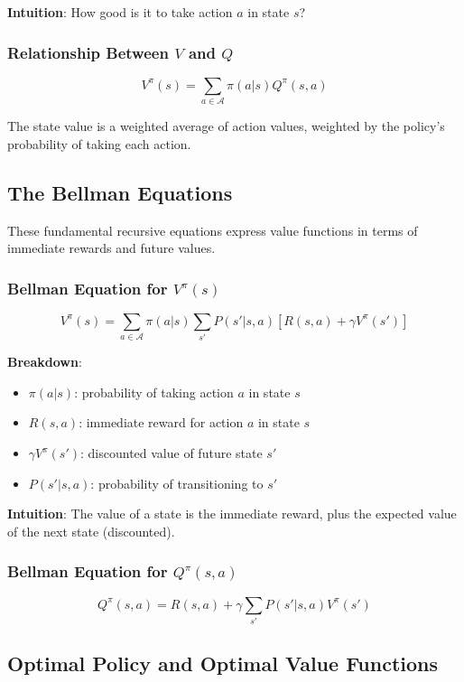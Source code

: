 \documentclass[12pt,a4paper]{article}
\begin{document}
\textbf{Intuition}: How good is it to take action $a$ in state $s$?

\subsubsection{Relationship Between $V$ and $Q$}

\[
V^{\pi}(s) = \sum_{a \in \mathcal{A}} \pi(a|s) Q^{\pi}(s, a)
\]

The state value is a weighted average of action values, weighted by the policy's probability of taking each action.

\subsection{The Bellman Equations}

These fundamental recursive equations express value functions in terms of immediate rewards and future values.

\subsubsection{Bellman Equation for $V^{\pi}(s)$}

\[
V^{\pi}(s) = \sum_{a \in \mathcal{A}} \pi(a|s) \sum_{s'} P(s'|s,a) \left[ R(s,a) + \gamma V^{\pi}(s') \right]
\]

\textbf{Breakdown}:
\begin{itemize}
    \item $\pi(a|s)$: probability of taking action $a$ in state $s$
    \item $R(s,a)$: immediate reward for action $a$ in state $s$
    \item $\gamma V^{\pi}(s')$: discounted value of future state $s'$
    \item $P(s'|s,a)$: probability of transitioning to $s'$
\end{itemize}

\textbf{Intuition}: The value of a state is the immediate reward, plus the expected value of the next state (discounted).

\subsubsection{Bellman Equation for $Q^{\pi}(s,a)$}

\[
Q^{\pi}(s, a) = R(s, a) + \gamma \sum_{s'} P(s'|s,a) V^{\pi}(s')
\]

\subsection{Optimal Policy and Optimal Value Functions}
\end{document}

